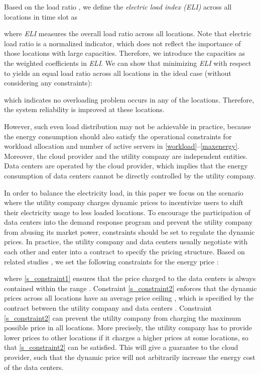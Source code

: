 \documentclass[journal]{IEEEtran}
\begin{document}
	Based on the load ratio , we define the \emph{electric load index (ELI)} across all locations in time slot  as
	
	where \emph{ELI} measures the overall load ratio across all locations. Note that electric load ratio  is a normalized indicator, which does not reflect the importance of those locations with large capacities. Therefore, we introduce the capacities  as the weighted coefficients in \emph{ELI}. We can show that minimizing \emph{ELI} with respect to   yields an equal load ratio across all locations in the ideal case (without considering any constraints):
	
	which indicates no overloading problem occurs in any of the locations. Therefore, the system reliability is improved at these locations.
	
	However, such even load distribution may not be achievable in practice, because the energy consumption  should also satisfy the operational constraints for workload allocation and number of active servers in \eqref{workload}--\eqref{maxenergy}. Moreover, the cloud provider and the utility company are independent entities. Data centers are operated by the cloud provider, which implies that the energy consumption of data centers cannot be directly controlled by the utility company.

	In order to balance the electricity load, in this paper we focus on the scenario where the utility company charges dynamic prices to incentivize users to shift their electricity usage to less loaded locations. To encourage the participation of data centers into the demand response program and prevent the utility company from abusing its market power, constraints should be set to regulate the dynamic prices. In practice, the utility company and data centers usually negotiate with each other and enter into a contract \cite{contract} to specify the pricing structure. Based on related studies \cite{energyecon}, we set the following constraints for the energy price :
	
	where \eqref{s_constraint1} ensures that the price charged to the data centers is always contained within the range . Constraint \eqref{s_constraint2} enforces that the dynamic prices across all locations have an average price ceiling , which is specified by the contract between the utility company and data centers \cite{energyecon}. Constraint \eqref{s_constraint2} can prevent the utility company from charging the maximum possible price in all locations. More precisely, the utility company has to provide lower prices to other locations if it charges a higher prices at some locations, so that \eqref{s_constraint2} can be satisfied. This will give a guarantee to the cloud provider, such that the dynamic price will not arbitrarily increase the energy cost of the data centers.
	
\end{document}
